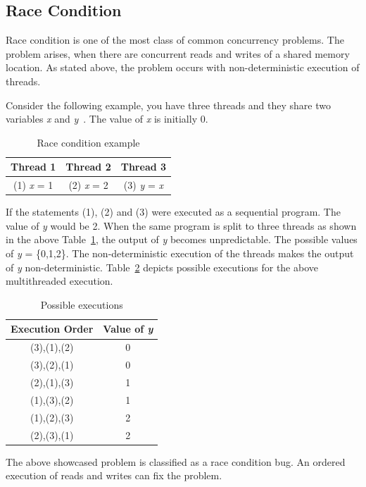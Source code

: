 \subsection{Race Condition}

Race condition is one of the most class of common concurrency problems.  
The problem arises, when there are concurrent reads and writes of a shared memory location. 
As stated above, the problem occurs with non-deterministic execution of threads. 

Consider the following example, you have three threads and they share two variables \emph{x} and \emph{y}~\citep{carver2005modern}. 
The value of \emph{x} is initially 0. 

\begin{table}[h]
\centering
\begin{tabular}{*{3}{c}}
Thread 1 & Thread 2 & Thread 3 \\
\hline
 (1) \emph{x} = 1 & (2) \emph{x} = 2 & (3) \emph{y} = \emph{x}\\
\end{tabular}
\caption{Race condition example}
\label{race_cond}
\end{table}

If the statements (1), (2) and (3) were executed as a sequential program. 
The value of \emph{y} would be 2. 
When the same program is split to three threads as shown in the above Table~\ref{race_cond}, the output of \emph{y} becomes unpredictable. 
The possible values of \emph{y} = \{0,1,2\}. 
The non-deterministic execution of the threads makes the output of \emph{y} non-deterministic. 
Table~\ref{poss_exec} depicts possible executions for the above multithreaded execution. 

\begin{table}[h]
\centering
\begin{tabular}{*{2}{c}}
Execution Order & Value of \emph{y} \\
\hline
 (3),(1),(2)& 0\\
 (3),(2),(1)& 0\\
 (2),(1),(3)& 1\\
 (1),(3),(2)& 1\\
 (1),(2),(3)& 2\\
 (2),(3),(1)& 2\\
\end{tabular}
\caption{Possible executions}
\label{poss_exec}
\end{table}

The above showcased problem is classified as a race condition bug. 
An ordered execution of reads and writes can fix the problem. 

